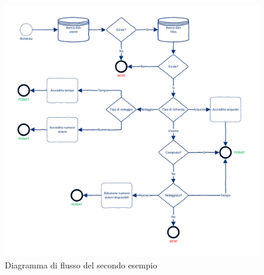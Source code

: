 \begin{figure}[h]
 \centering 
	\includegraphics[scale = 0.75]{./Visio_Project/DiagrammaFlussoSecondoEsempio.pdf}
 \caption{Diagramma di flusso del secondo esempio}
 \label{fig:diagrammaflussosecondoesempio}
\end{figure}
